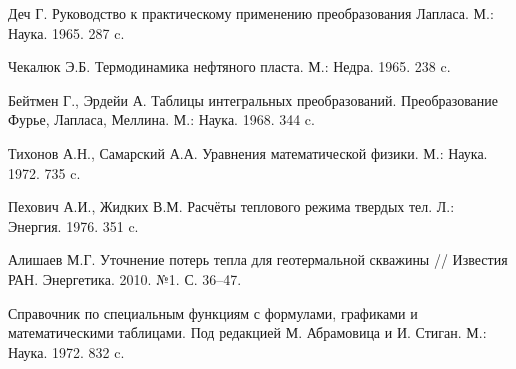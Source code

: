 \begin{thebibliography}{1} %


 Деч Г. Руководство к практическому применению преобразования Лапласа. М.: Наука. 1965. 287 c.

 Чекалюк Э.Б. Термодинамика нефтяного пласта. М.: Недра. 1965. 238 c.

	Бейтмен Г., Эрдейи А. Таблицы интегральных преобразований. Преобразование Фурье, Лапласа, Меллина. М.: Наука. 1968. 344 c.

 Тихонов А.Н., Самарский А.А. Уравнения математической физики.  М.:  Наука. 1972. 735 c.

 Пехович А.И., Жидких В.М. Расчёты теплового режима твердых тел. Л.: Энергия. 1976. 351 c.

 Алишаев М.Г. Уточнение потерь тепла для геотермальной скважины // Известия РАН. Энергетика. 2010. №1. С. 36--47.

 Справочник по специальным функциям с формулами, графиками и математическими таблицами. Под редакцией М. Абрамовица и И. Стиган. М.: Наука.  1972. 832 c.



\end{thebibliography}
